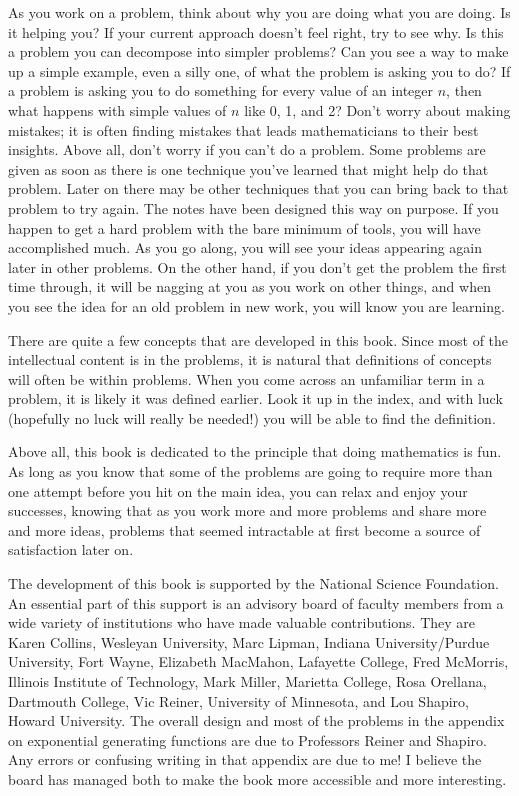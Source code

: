 \documentclass[10pt,]{book}
\theoremstyle{plain}
\theoremstyle{definition}
\theoremstyle{definition}
\numberwithin{equation}{chapter}
\begin{document}
\par
\hypertarget{p-16}{}%
As you work on a problem, think about why you are doing what you are doing. Is it helping you? If your current approach doesn't feel right, try to see why. Is this a problem you can decompose into simpler problems? Can you see a way to make up a simple example, even a silly one, of what the problem is asking you to do? If a problem is asking you to do something for every value of an integer \(n\), then what happens with simple values of \(n\) like 0, 1, and 2? Don't worry about making mistakes; it is often finding mistakes that leads mathematicians to their best insights. Above all, don't worry if you can't do a problem. Some problems are given as soon as there is one technique you've learned that might help do that problem. Later on there may be other techniques that you can bring back to that problem to try again. The notes have been designed this way on purpose. If you happen to get a hard problem with the bare minimum of tools, you will have accomplished much. As you go along, you will see your ideas appearing again later in other problems. On the other hand, if you don't get the problem the first time through, it will be nagging at you as you work on other things, and when you see the idea for an old problem in new work, you will know you are learning.%
\par
\hypertarget{p-17}{}%
There are quite a few concepts that are developed in this book. Since most of the intellectual content is in the problems, it is natural that definitions of concepts will often be within problems. When you come across an unfamiliar term in a problem, it is likely it was defined earlier. Look it up in the index, and with luck (hopefully no luck will really be needed!) you will be able to find the definition.%
\par
\hypertarget{p-18}{}%
Above all, this book is dedicated to the principle that doing mathematics is fun. As long as you know that some of the problems are going to require more than one attempt before you hit on the main idea, you can relax and enjoy your successes, knowing that as you work more and more problems and share more and more ideas, problems that seemed intractable at first become a source of satisfaction later on.%
\par
\hypertarget{p-19}{}%
The development of this book is supported by the National Science Foundation. An essential part of this support is an advisory board of faculty members from a wide variety of institutions who have made valuable contributions. They are Karen Collins, Wesleyan University, Marc Lipman, Indiana University/Purdue University, Fort Wayne, Elizabeth MacMahon, Lafayette College, Fred McMorris, Illinois Institute of Technology, Mark Miller, Marietta College, Rosa Orellana, Dartmouth College, Vic Reiner, University of Minnesota, and Lou Shapiro, Howard University. The overall design and most of the problems in the appendix on exponential generating functions are due to Professors Reiner and Shapiro. Any errors or confusing writing in that appendix are due to me! I believe the board has managed both to make the book more accessible and more interesting.%
\end{document}
